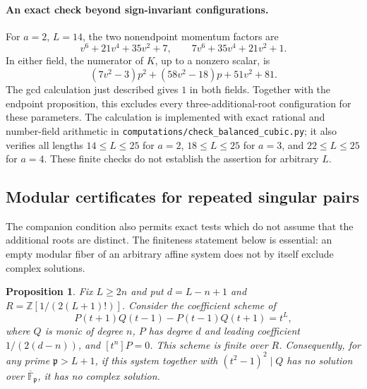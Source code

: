 \documentclass[11pt]{article}
\newtheorem{proposition}{Proposition}[section]
\theoremstyle{definition}
\begin{document}
\paragraph{An exact check beyond sign-invariant configurations.}
For $a=2$, $L=14$, the two nonendpoint momentum factors are
\[
 v^6+21v^4+35v^2+7,\qquad
 7v^6+35v^4+21v^2+1.
\]
In either field, the numerator of $K$, up to a nonzero scalar, is
\[
 (7v^2-3)p^2+(58v^2-18)p+51v^2+81.
\]
The gcd calculation just described gives $1$ in both fields.
Together with the endpoint proposition, this excludes every
three-additional-root configuration for these parameters. The
calculation is implemented with exact rational and number-field
arithmetic in \texttt{computations/check\_balanced\_cubic.py}; it
also verifies all lengths $14\le L\le25$ for $a=2$,
$18\le L\le25$ for $a=3$, and $22\le L\le25$ for $a=4$.
These finite checks do not establish the assertion for arbitrary $L$.

\subsection{Modular certificates for repeated singular pairs}

The companion condition also permits exact tests which do not assume
that the additional roots are distinct. The finiteness statement below
is essential: an empty modular fiber of an arbitrary affine system
does not by itself exclude complex solutions.

\begin{proposition}\label{prop:finite-wronskian-family}
Fix $L\ge2n$ and put $d=L-n+1$ and
$R=\mathbb Z[1/(2(L+1)!)]$. Consider the coefficient scheme of
\[
 P(t+1)Q(t-1)-P(t-1)Q(t+1)=t^L,
\]
where $Q$ is monic of degree $n$, $P$ has degree $d$ and leading
coefficient $1/(2(d-n))$, and $[t^n]P=0$. This scheme is finite
over $R$. Consequently, for any prime $\mathfrak p>L+1$, if this
system together with $(t^2-1)^2\mid Q$ has no solution over
$\overline{\mathbb F}_{\mathfrak p}$, it has no complex solution.
\end{proposition}
\end{document}
